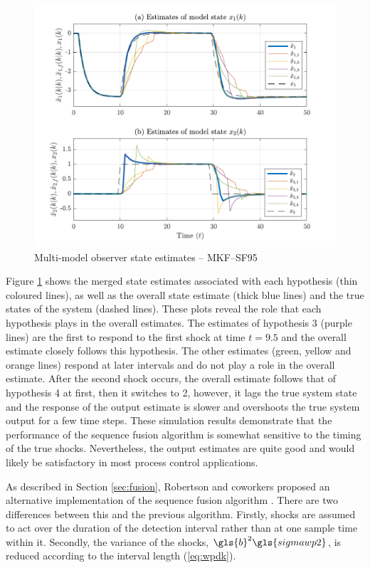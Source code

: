 \begin{figure}[htp]
	\centering
	\includegraphics[width=13cm]{images/rod_MKF_test_sim_MKF_SF95_x_est.pdf}
	\caption{Multi-model observer state estimates – MKF--SF95}
	\label{fig:rod-obs-sim-test-x_est-SF95}
\end{figure}
Figure \ref{fig:rod-obs-sim-test-x_est-SF95} shows the merged state estimates associated with each hypothesis (thin coloured lines), as well as the overall state estimate (thick blue lines) and the true states of the system (dashed lines). These plots reveal the role that each hypothesis plays in the overall estimates. The estimates of hypothesis 3 (purple lines) are the first to respond to the first shock at time $t=9.5$ and the overall estimate closely follows this hypothesis. The other estimates (green, yellow and orange lines) respond at later intervals and do not play a role in the overall estimate. After the second shock occurs, the overall estimate follows that of hypothesis 4 at first, then it switches to 2, however, it lags the true system state and the response of the output estimate is slower and overshoots the true system output for a few time steps. These simulation results demonstrate that the performance of the sequence fusion algorithm is somewhat sensitive to the timing of the true shocks. Nevertheless, the output estimates are quite good and would likely be satisfactory in most process control applications. 

As described in Section \ref{sec:fusion}, Robertson and coworkers proposed an alternative implementation of the sequence fusion algorithm \citep{robertson_method_1998}. There are two differences between this and the previous algorithm. Firstly, shocks are assumed to act over the duration of the detection interval rather than at one sample time within it. Secondly, the variance of the shocks, $\gls{b}^2\gls{sigmawp2}$, is reduced according to the interval length (\ref{eq:wpdk}).

